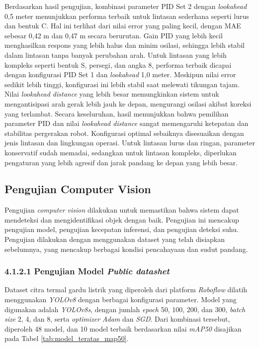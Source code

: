 Berdasarkan hasil pengujian, kombinasi parameter PID Set 2 dengan \textit{lookahead}
0{,}5 meter menunjukkan performa terbaik untuk lintasan sederhana seperti lurus dan
bentuk C. Hal ini terlihat dari nilai error yang paling kecil, dengan MAE sebesar
0{,42} m dan 0{,47} m secara berurutan. Gain PID yang lebih kecil menghasilkan
respons yang lebih halus dan minim osilasi, sehingga lebih stabil dalam lintasan
tanpa banyak perubahan arah. Untuk lintasan yang lebih kompleks seperti bentuk S,
persegi, dan angka 8, performa terbaik dicapai dengan konfigurasi PID Set 1 dan \textit{lookahead}
1{,}0 meter. Meskipun nilai error sedikit lebih tinggi, konfigurasi ini lebih
stabil saat melewati tikungan tajam. Nilai \textit{lookahead distance} yang
lebih besar memungkinkan sistem untuk mengantisipasi arah gerak lebih jauh ke
depan, mengurangi osilasi akibat koreksi yang terlambat. Secara keseluruhan, hasil
menunjukkan bahwa pemilihan parameter PID dan nilai \textit{lookahead distance}
sangat memengaruhi ketepatan dan stabilitas pergerakan robot. Konfigurasi optimal
sebaiknya disesuaikan dengan jenis lintasan dan lingkungan operasi. Untuk
lintasan lurus dan ringan, parameter konservatif sudah memadai, sedangkan untuk
lintasan kompleks, diperlukan pengaturan yang lebih agresif dan jarak pandang ke
depan yang lebih besar.

\subsection{Pengujian Computer Vision}
Pengujian \emph{computer vision} dilakukan untuk memastikan bahwa sistem dapat
mendeteksi dan mengidentifikasi objek dengan baik. Pengujian ini mencakup pengujian
model, pengujian kecepatan inferensi, dan pengujian deteksi suhu. Pengujian
dilakukan dengan menggunakan dataset yang telah disiapkan sebelumnya, yang mencakup
berbagai kondisi pencahayaan dan sudut pandang.

\subsubsection{4.1.2.1 Pengujian Model \emph{Public datashet}}
Dataset citra termal gardu listrik yang diperoleh dari platform \emph{Roboflow}
dilatih menggunakan \emph{YOLOv8} dengan berbagai konfigurasi parameter. Model
yang digunakan adalah \emph{YOLOv8s}, dengan jumlah \emph{epoch} 50, 100, 200,
dan 300, \emph{batch size} 2, 4, dan 8, serta \emph{optimizer} \emph{Adam} dan \emph{SGD}.
Dari kombinasi tersebut, diperoleh 48 model, dan 10 model terbaik berdasarkan nilai
\emph{mAP50} disajikan pada Tabel \ref{tab:model_teratas_map50}.

